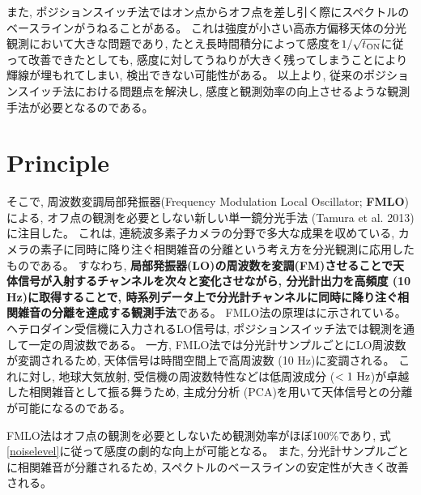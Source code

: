 \documentclass[a4paper,10pt,oneside,twocolumn,notitlepage,final]{jarticle}
\begin{document}
また, ポジションスイッチ法ではオン点からオフ点を差し引く際にスペクトルのベースラインがうねることがある。
これは強度が小さい高赤方偏移天体の分光観測において大きな問題であり, たとえ長時間積分によって感度を$1/\sqrt{t_{\mathrm{ON}}}$に従って改善できたとしても,
感度に対してうねりが大きく残ってしまうことにより輝線が埋もれてしまい, 検出できない可能性がある。
以上より, 従来のポジションスイッチ法における問題点を解決し, 感度と観測効率の向上させるような観測手法が必要となるのである。

\vspace{-5mm}
\section{Principle}
そこで, 周波数変調局部発振器(Frequency Modulation Local Oscillator; \textbf{FMLO})による, オフ点の観測を必要としない新しい単一鏡分光手法 (Tamura et al. 2013)に注目した。
これは, 連続波多素子カメラの分野で多大な成果を収めている, カメラの素子に同時に降り注ぐ相関雑音の分離という考え方を分光観測に応用したものである。
すなわち, \textbf{局部発振器(LO)の周波数を変調(FM)させることで天体信号が入射するチャンネルを次々と変化させながら, 分光計出力を高頻度 (10 Hz)に取得することで, 時系列データ上で分光計チャンネルに同時に降り注ぐ相関雑音の分離を達成する観測手法}である。
FMLO法の原理はに示されている。
ヘテロダイン受信機に入力されるLO信号は, ポジションスイッチ法では観測を通して一定の周波数である。
一方, FMLO法では分光計サンプルごとにLO周波数が変調されるため, 天体信号は時間空間上で高周波数 (10 Hz)に変調される。
これに対し, 地球大気放射, 受信機の周波数特性などは低周波成分 ($<1\,\,\mathrm{Hz}$)が卓越した相関雑音として振る舞うため, 主成分分析 (PCA)を用いて天体信号との分離が可能になるのである。

FMLO法はオフ点の観測を必要としないため観測効率がほぼ100\%であり, 式\eqref{noiselevel}に従って感度の劇的な向上が可能となる。
また, 分光計サンプルごとに相関雑音が分離されるため, スペクトルのベースラインの安定性が大きく改善される。
\end{document}

